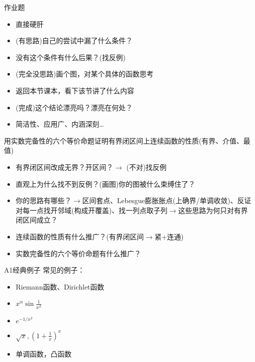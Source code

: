 \documentclass[pdf]{beamer}
\numberwithin{equation}{section}
\theoremstyle{plain}
\theoremstyle{plain}
\theoremstyle{plain}
\theoremstyle{remark}
\begin{document}
\begin{frame}{作业题}
\begin{itemize}
	\item 直接硬肝
	\item (有思路)自己的尝试中漏了什么条件？
	\item[] \phantom{(有思路)}没有这个条件有什么后果？(找反例)
	\item (完全没思路)画个图，对某个具体的函数思考 
	\item[] \phantom{(完全没思路)}返回本节课本，看下该节讲了什么内容
	\item (完成)这个结论漂亮吗？漂亮在何处？
	\item[] \phantom{(完全)}简洁性、应用广、内涵深刻…
\end{itemize}
\end{frame}
\begin{frame}
\begin{example}
用实数完备性的六个等价命题证明有界闭区间上连续函数的性质(有界、介值、最值)
\begin{itemize}
	\item 有界闭区间改成无界？开区间？$\longrightarrow$ (不对)找反例
	\item 直观上为什么找不到反例？(画图)你的图被什么束缚住了？
	\item 你的思路有哪些？$\longrightarrow$区间套点、Lebesgue膨胀胀点(上确界/单调收敛)、反证对每一点找开邻域(构成开覆盖)、找一列点取子列$\longrightarrow$这些思路为何只对有界闭区间成立？
	\item 连续函数的性质有什么推广？(有界闭区间$\rightarrow$紧+连通)
	\item[] 实数完备性的六个等价命题有什么推广？
	
\end{itemize}
\end{example}


\end{frame}

\begin{frame}{A1经典例子}
常见的例子：
\begin{itemize}
	\item Riemann函数、Dirichlet函数
	\item $x^{\alpha}\sin \frac{1}{x^{\beta}}$
	\item $e^{-1/x^2}$
	\item $\sqrt{x}, (1+\frac{1}{x})^x$
	\item 单调函数，凸函数
\end{itemize}
\end{frame}
\end{document}
